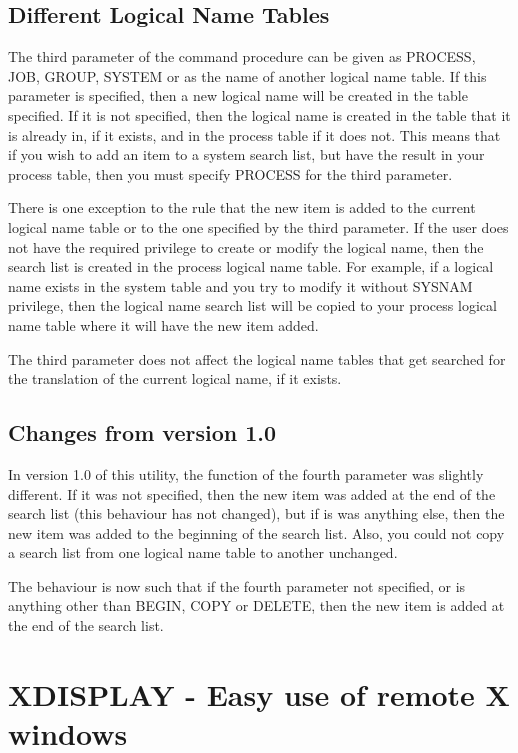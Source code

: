 \subsection{Different Logical Name Tables}

The third parameter of the command procedure can be given as PROCESS, JOB,
GROUP, SYSTEM or as the name of another logical name table. If this parameter
is specified, then a new logical name will be created in the table specified.
If it is not specified, then the logical name is created in the table that it
is already in, if it exists, and in the process table if it does not. This
means that if you wish to add an item to a system search list, but have the
result in your process table, then you must specify PROCESS for the third
parameter.

There is one exception to the rule that the new item is added to the current
logical name table or to the one specified by the third parameter. If the user
does not have the required privilege to create or modify the logical name, then
the search list is created in the process logical name table. For example, if a
logical name exists in the system table and you try to modify it without SYSNAM
privilege, then the logical name search list will be copied to your process
logical name table where it will have the new item added.

The third parameter does not affect the logical name tables that get searched
for the translation of the current logical name, if it exists.

\subsection{Changes from version 1.0}

In version 1.0 of this utility, the function of the fourth parameter was
slightly different. If it was not specified, then the new item was added at the
end of the search list (this behaviour has not changed), but if is was anything
else, then the new item was added to the beginning of the search list. Also,
you could not copy a search list from one logical name table to another
unchanged.

The behaviour is now such that if the fourth parameter not specified, or is
anything other than BEGIN, COPY or DELETE, then the new item is added at the
end of the search list.


\section{XDISPLAY - Easy use of remote X windows}

